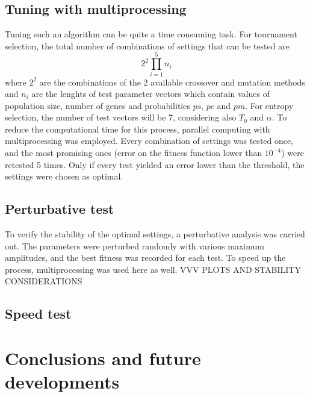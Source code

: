 \documentclass[twocolumn]{article}
\begin{document}
\subsection{Tuning with multiprocessing}
Tuning such an algorithm can be quite a time consuming task. For tournament selection, the total number of combinations of settings that can be tested are
\begin{equation}
  2^2\prod_{i=1}^5 n_i
  \label{eq:Tourn_settings_comb}
\end{equation}
where $2^2$ are the combinations of the 2 available crossover and mutation methods and $n_i$ are the lenghts of test parameter vectors which contain values of population size, number of genes and probabilities $ps$, $pc$ and $pm$. For entropy selection, the number of test vectors will be 7, considering also $T_0$ and $\alpha$.
To reduce the computational time for this process, parallel computing with multiprocessing was employed. Every combination of settings was tested once, and the most promising ones (error on the fitness function lower than $10^{-4}$) were retested 5 times. Only if every test yielded an error lower than the threshold, the settings were chosen as optimal.

\subsection{Perturbative test}
To verify the stability of the optimal settings, a perturbative analysis was carried out. The parameters were perturbed randomly with various maximum amplitudes, and the best fitness was recorded for each test. To speed up the process, multiprocessing was used here as well.  VVV PLOTS AND STABILITY CONSIDERATIONS

\subsection{Speed test}

\section{Conclusions and future developments}




\end{document}
